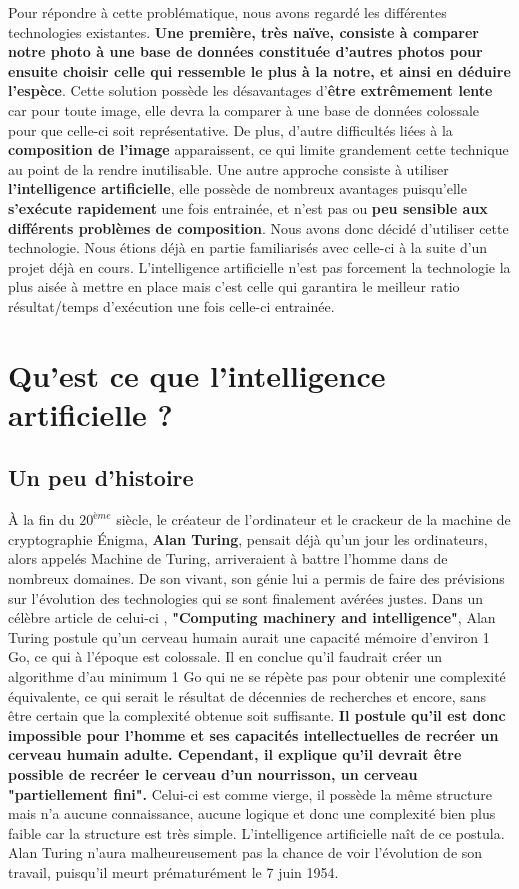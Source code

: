 \documentclass[12pt,a4paper]{extarticle}
\begin{document}
Pour répondre à cette problématique, nous avons regardé les différentes technologies existantes. \textbf{Une première, très naïve, consiste à comparer notre photo à une base de données constituée d'autres photos pour ensuite choisir celle qui ressemble le plus à la notre, et ainsi en déduire l'espèce}. Cette solution possède les désavantages d'\textbf{être extrêmement lente} car pour toute image, elle devra la comparer à une base de données colossale pour que celle-ci soit représentative. De plus, d'autre difficultés liées à la\textbf{ composition de l'image} apparaissent, ce qui limite grandement cette technique au point de la rendre inutilisable. Une autre approche consiste à utiliser \textbf{l'intelligence artificielle}, elle possède de nombreux avantages puisqu'elle \textbf{s'exécute rapidement} une fois entrainée, et n'est pas ou \textbf{peu sensible aux différents problèmes de composition}. Nous avons donc décidé d'utiliser cette technologie. Nous étions déjà en partie familiarisés avec celle-ci à la suite d'un projet déjà en cours. L'intelligence artificielle n'est pas forcement la technologie la plus aisée à mettre en place mais c'est celle qui garantira le meilleur ratio résultat/temps d'exécution une fois celle-ci entrainée. 

\section{Qu'est ce que l'intelligence artificielle ?}

\subsection{Un peu d'histoire}
À la fin du $20^{ème}$ siècle, le créateur de l'ordinateur et le crackeur de la machine de cryptographie \'Enigma,\textbf{ Alan Turing}, pensait déjà qu'un jour les ordinateurs, alors appelés Machine de Turing, arriveraient à battre l'homme dans de nombreux domaines. De son vivant, son génie lui a permis de faire des prévisions sur l'évolution des technologies qui se sont finalement avérées justes. Dans un célèbre article de celui-ci , \textbf{"Computing machinery and intelligence"}, Alan Turing postule qu'un cerveau humain aurait une capacité mémoire d'environ 1 Go, ce qui à l'époque est colossale. Il en conclue qu'il faudrait créer un algorithme d'au minimum 1 Go qui ne se répète pas pour obtenir une complexité équivalente, ce qui serait le résultat de décennies de recherches et encore, sans être certain que la complexité obtenue soit suffisante. \textbf{Il postule qu'il est donc impossible pour l'homme et ses capacités intellectuelles de recréer un cerveau humain adulte. Cependant, il explique qu'il devrait être possible de recréer le cerveau d'un nourrisson, un cerveau "partiellement fini".} Celui-ci est comme vierge, il possède la même structure mais n'a aucune connaissance, aucune logique et donc une complexité bien plus faible car la structure est très simple. L'intelligence artificielle naît de ce postula. Alan Turing n'aura malheureusement pas la chance de voir l'évolution de son travail, puisqu'il meurt prématurément le 7 juin 1954. 
\end{document}
